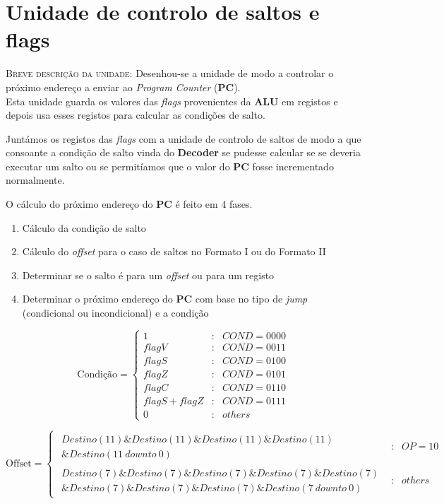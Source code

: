 \chapter{Unidade de controlo de saltos e flags}
\textsc{Breve descrição da unidade: } Desenhou-se a unidade de modo a controlar o próximo endereço a enviar ao \textit{Program Counter} (\textbf{PC}).\\
Esta unidade guarda os valores das \textit{flags} provenientes da \textbf{ALU} em registos e depois usa esses registos para calcular as condições de salto.\par
Juntámos os registos das \textit{flags} com a unidade de controlo de saltos de modo a que consoante a condição de salto vinda do \textbf{Decoder} se pudesse calcular se se deveria executar um salto ou se permitíamos que o valor do \textbf{PC} fosse incrementado normalmente.\par
O cálculo do próximo endereço do \textbf{PC} é feito em 4 fases.
\begin{enumerate}
	\setlength{\itemindent}{25pt}
	\item Cálculo da condição de salto
	\item Cálculo do \textit{offset} para o caso de saltos no Formato I ou do Formato II
	\item Determinar se o salto é para um \textit{offset} ou para um registo
	\item Determinar o próximo endereço do \textbf{PC} com base no tipo de \textit{jump} (condicional ou incondicional) e a condição
\end{enumerate}

\[\text{Condição}=\left\{
	\begin{array}{rcl}
	1 & : & COND=0000\\
	flagV & : & COND=0011\\
	flagS & : & COND=0100\\
	flagZ & : & COND=0101\\
	flagC & : &  COND=0110\\
	flagS+flagZ & : & COND=0111\\
	0 & : & others
	\end{array}\right.\]

\[\text{Offset}=\left\{
	\begin{array}{rcl}
	\begin{array}{r}
	Destino(11)\&Destino(11)\&Destino(11)\&Destino(11)\\
	\&Destino(11\ downto\ 0)
	\end{array} & : & OP=10\\
	\begin{array}{r}
	Destino(7)\&Destino(7)\&Destino(7)\&Destino(7)\&Destino(7)\\
	\&Destino(7)\&Destino(7)\&Destino(7)\&Destino(7\ downto\ 0)
	\end{array} & : & others
	\end{array}\right.\]

